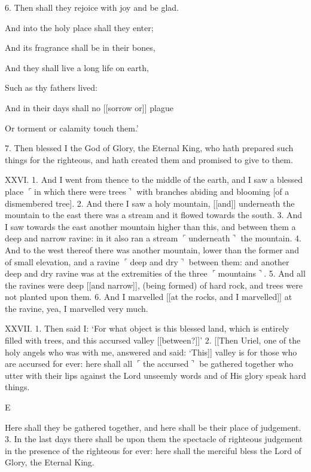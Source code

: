 6. Then shall they rejoice with joy and be glad.

And into the holy place shall they enter;

And its fragrance shall be in their bones,

And they shall live a long life on earth,

Such as thy fathers lived:

And in their days shall no [[sorrow or]] plague

Or torment or calamity touch them.’

7. Then blessed I the God of Glory, the Eternal
King, who hath prepared such things for the righteous,
and hath created them and promised to give to them.


XXVI. 1. And I went from thence to the middle
of the earth, and I saw a blessed place $\ulcorner$in which there
were trees$\urcorner$ with branches abiding and blooming
[of a dismembered tree]. 2. And there I saw a holy
mountain, [[and]] underneath the mountain to the
east there was a stream and it flowed towards the
south. 3. And I saw towards the east another
mountain higher than this, and between them a deep
and narrow ravine: in it also ran a stream $\ulcorner$underneath$\urcorner$
the mountain. 4. And to the west thereof
there was another mountain, lower than the former
and of small elevation, and a ravine $\ulcorner$deep and dry$\urcorner$
between them: and another deep and dry ravine
was at the extremities of the three $\ulcorner$mountains$\urcorner$.
5. And all the ravines were deep [[and narrow]],
(being formed) of hard rock, and trees were not planted
upon them. 6. And I marvelled [[at the rocks, and
I marvelled]] at the ravine, yea, I marvelled very
much.


XXVII. 1. Then said I: ‘For what object is this
blessed land, which is entirely filled with trees, and
this accursed valley [[between?]]’ 2. [[Then Uriel,
one of the holy angels who was with me, answered
and said: ‘This]] valley is for those who are
accursed for ever: here shall all $\ulcorner$the accursed$\urcorner$ be
gathered together who utter with their lips against
the Lord unseemly words and of His glory speak hard
things.

E

Here shall they be
gathered together, and
here shall be their place
of judgement. 3. In the
last days there shall be
upon them the spectacle
of righteous judgement
in the presence of the
righteous for ever: here
shall the merciful bless
the Lord of Glory, the
Eternal King.

